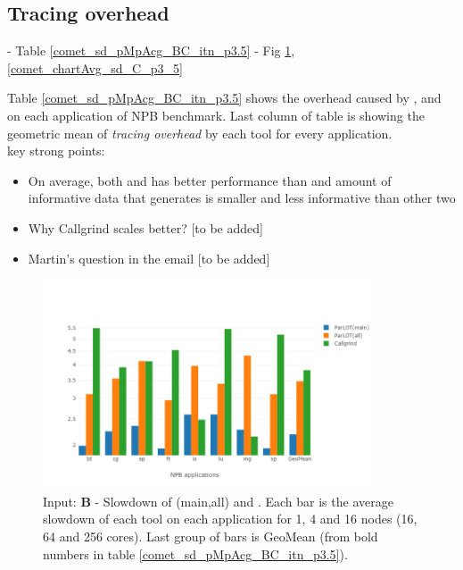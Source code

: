

\subsection{Tracing overhead}
\label{subsec:lowtoh}
 - Table \ref{comet_sd_pMpAcg_BC_itn_p3.5}
 - Fig \ref{comet_chartAvg_sd_B_p3_5}, \ref{comet_chartAvg_sd_C_p3_5} 
 

   
Table \ref{comet_sd_pMpAcg_BC_itn_p3.5} shows the overhead caused by \parlotm, \parlota and  \callgrind on each application of NPB benchmark.
 Last column of table is showing the geometric mean of \textit{tracing overhead} by each tool for every application. \\
key strong points:
\begin{itemize}
\item On average, both \parlotm and \parlota has better performance than \callgrind and amount of informative data that \callgrind generates is smaller and less informative than other two
\item Why Callgrind scales better? [to be added]
\item Martin's question in the email [to be added]
\end{itemize}

\begin{figure}[!t]
\centering
\includegraphics[width=3.9in]{figs.comet/comet_chartAvg_sd_B_p3_5.png}
\caption{ Input: \textbf{B} - Slowdown of \parlot(main,all) and \callgrind. Each bar is the average slowdown of each tool on each application for 1, 4 and 16 nodes (16, 64 and 256 cores). Last group of bars is GeoMean (from bold numbers in table \ref{comet_sd_pMpAcg_BC_itn_p3.5}). 
}
\label{comet_chartAvg_sd_B_p3_5}
\end{figure}


